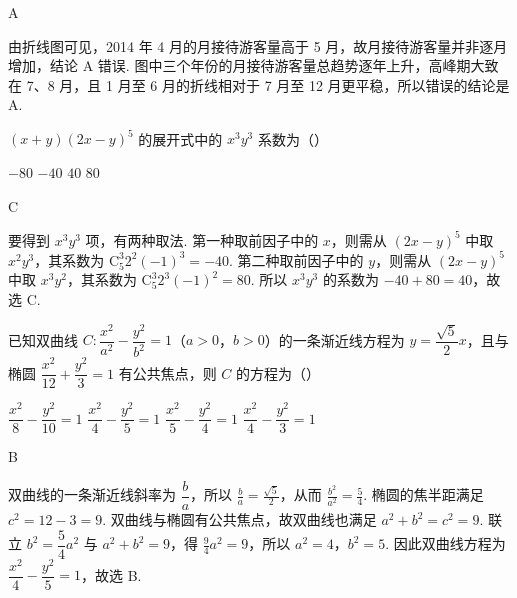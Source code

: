 \begin{answer}
A
\end{answer}

\begin{solution}
由折线图可见，2014 年 4 月的月接待游客量高于 5 月，故月接待游客量并非逐月增加，结论 A 错误. 图中三个年份的月接待游客量总趋势逐年上升，高峰期大致在 7、8 月，且 1 月至 6 月的折线相对于 7 月至 12 月更平稳，所以错误的结论是 A.
\end{solution}

\begin{problem}
\((x+y)(2x-y)^5\) 的展开式中的 \(x^3y^3\) 系数为（\quad）

\choices
    {\(-80\)}
    {\(-40\)}
    {\(40\)}
    {\(80\)}
\end{problem}

\begin{answer}
C
\end{answer}

\begin{solution}
要得到 \(x^3y^3\) 项，有两种取法. 第一种取前因子中的 \(x\)，则需从 \((2x-y)^5\) 中取 \(x^2y^3\)，其系数为 \(\mathrm C_5^3 2^2(-1)^3=-40\). 第二种取前因子中的 \(y\)，则需从 \((2x-y)^5\) 中取 \(x^3y^2\)，其系数为 \(\mathrm C_5^3 2^3(-1)^2=80\).
所以 \(x^3y^3\) 的系数为 \(-40+80=40\)，故选 C.
\end{solution}

\begin{problem}
已知双曲线 \(C:\dfrac{x^2}{a^2}-\dfrac{y^2}{b^2}=1\)（\(a>0\)，\(b>0\)）的一条渐近线方程为 \(y=\dfrac{\sqrt5}{2}x\)，且与椭圆 \(\dfrac{x^2}{12}+\dfrac{y^2}{3}=1\) 有公共焦点，则 \(C\) 的方程为（\quad）

\choices
    {\(\dfrac{x^2}{8}-\dfrac{y^2}{10}=1\)}
    {\(\dfrac{x^2}{4}-\dfrac{y^2}{5}=1\)}
    {\(\dfrac{x^2}{5}-\dfrac{y^2}{4}=1\)}
    {\(\dfrac{x^2}{4}-\dfrac{y^2}{3}=1\)}
\end{problem}

\begin{answer}
B
\end{answer}

\begin{solution}
双曲线的一条渐近线斜率为 \(\dfrac ba\)，所以 \(\frac ba=\frac{\sqrt5}{2}\)，从而 \(\frac{b^2}{a^2}=\frac54\).
椭圆的焦半距满足 \(c^2=12-3=9\). 双曲线与椭圆有公共焦点，故双曲线也满足 \(a^2+b^2=c^2=9\).
联立 \(b^2=\dfrac54a^2\) 与 \(a^2+b^2=9\)，得 \(\frac94a^2=9\)，所以 \(a^2=4\)，\(b^2=5\).
因此双曲线方程为 \(\dfrac{x^2}{4}-\dfrac{y^2}{5}=1\)，故选 B.
\end{solution}

